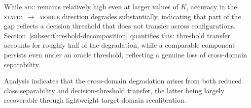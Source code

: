 

%

While \textsc{auc} remains relatively high even at larger values of $K$, accuracy
in the \textsc{static}~$\rightarrow$~\textsc{mobile} direction degrades
substantially, indicating that part of the gap reflects a decision threshold that
does not transfer across configurations. Section~\ref{subsec:threshold-decomposition}
quantifies this: threshold transfer accounts for roughly half of the degradation,
while a comparable component persists even under an oracle threshold, reflecting a
genuine loss of cross-domain separability.



Analysis indicates that the cross-domain degradation arises from both reduced class
separability and decision-threshold transfer, the latter being largely recoverable
through lightweight target-domain recalibration.



